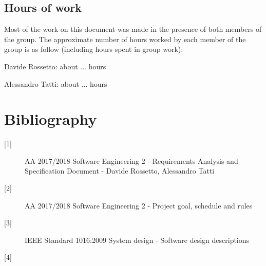 \documentclass{article}
\begin{document}
	\subsection{Hours of work}

	Most of the work on this document was made in the presence of both members of the group. The approximate number of hours worked by each member of the group is as follow (including hours spent in group work):
	
	\bigskip
	Davide Rossetto: about ... hours
	
	Alessandro Tatti: about ... hours

	
	\section{Bibliography}
	
	\begin{description}
	\item[[1{]}] AA 2017/2018 Software Engineering 2 - Requirements Analysis and Specification Document - Davide Rossetto, Alessandro Tatti
	\item[[2{]}] AA 2017/2018 Software Engineering 2 - Project goal, schedule and rules
	\item[[3{]}] IEEE Standard 1016:2009 System design - Software design descriptions
	\item[[4{]}]
	\end{description}
\end{document}
